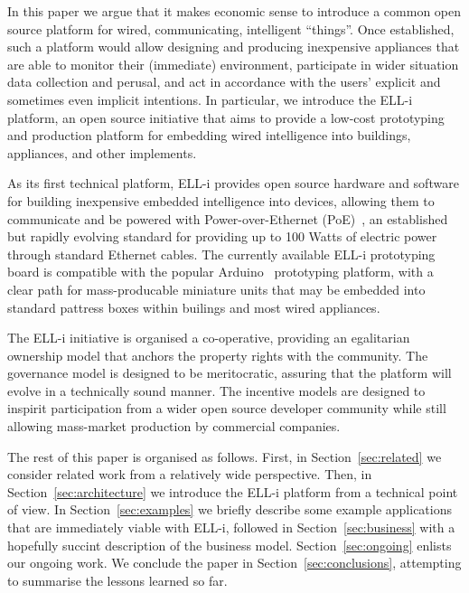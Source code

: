 \documentclass[draft,a4paper]{siamltex}
\begin{document}
In this paper we argue that it makes economic sense to introduce a
common open source platform for wired, communicating, intelligent
``things''.  Once established, such a platform would allow designing
and producing inexpensive appliances that are able to monitor their
(immediate) environment, participate in wider situation data
collection and perusal, and act in accordance with the users' explicit
and sometimes even implicit intentions.  In particular, we introduce
the ELL-i platform, an open source initiative that aims to provide a
low-cost prototyping and production platform for embedding wired
intelligence into buildings, appliances, and other implements.

As its first technical platform, ELL-i provides open source hardware
and software for building inexpensive embedded intelligence into
devices, allowing them to communicate and be powered with
Power-over-Ethernet (PoE)~\cite{PoE}, an established but rapidly
evolving standard for providing up to 100 Watts of electric power
through standard Ethernet cables.  The currently available ELL-i
prototyping board is compatible with the popular
Arduino~\cite{ArduinoProject} prototyping platform, with a clear path
for mass-producable miniature units that may be embedded into standard
pattress boxes within builings and most wired appliances.

The ELL-i initiative is organised a co-operative, providing an
egalitarian ownership model that anchors the property rights with the
community.  The governance model is designed to be meritocratic,
assuring that the platform will evolve in a technically sound manner.
The incentive models are designed to inspirit participation from a
wider open source developer community while still allowing mass-market
production by commercial companies.

The rest of this paper is organised as follows.  First, in
Section~\ref{sec:related} we consider related work from a relatively
wide perspective.  Then, in Section~\ref{sec:architecture} we
introduce the ELL-i platform from a technical point of view.  In
Section~\ref{sec:examples} we briefly describe some example
applications that are immediately viable with ELL-i, followed in
Section~\ref{sec:business} with a hopefully succint description of the
business model.  Section~\ref{sec:ongoing} enlists our ongoing work.
We conclude the paper in Section~\ref{sec:conclusions}, attempting to
summarise the lessons learned so far.
 
\end{document}
